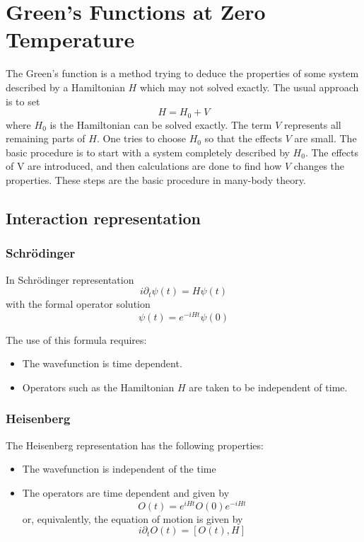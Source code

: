 \chapter{Green's Functions at Zero Temperature}
The Green's function is a method trying to deduce the properties of some system described by a Hamiltonian $H$ which may not solved exactly. The usual approach is to set
%
\begin{equation}\label{2.1}
H= H_0 + V
\end{equation}
%
where $H_0$ is the Hamiltonian can be solved exactly.
The term $V$ represents all remaining parts of $H$.
One tries to choose $H_0$ so that the effects $V$ are small.
The basic procedure is to start with a system completely described by $H_0$.
The effects of V are introduced, and then calculations are done to find how $V$ changes the properties.
These steps are the basic procedure in many-body theory.

\section{Interaction representation}\label{s2.1}
\subsection{Schr\"{o}dinger}
In Schr\"{o}dinger representation
%
\begin{equation}\label{2.2}
i\partial_t\psi(t) = H\psi(t)
\end{equation}
with the formal operator solution
\begin{equation}\label{2.3}
\psi(t) = e^{-i H t}\psi(0)
\end{equation}

The use of this formula requires:
\begin{itemize}
  \item The wavefunction is time dependent.
  \item Operators such as the Hamiltonian $H$ are taken to be independent of time.
\end{itemize}

\subsection{Heisenberg}
The Heisenberg representation has the following properties:
\begin{itemize}
  \item The wavefunction is independent of the time
  \item The operators are time dependent and given by
  \begin{equation}\label{2.4}
    O(t)=e^{i H t}O(0) e^{-i Ht}
  \end{equation}
  or, equivalently, the equation of motion is given by
  \begin{equation}
    \label{2.5}
    i\partial_t O(t) = [O(t),H]
  \end{equation}
\end{itemize}

